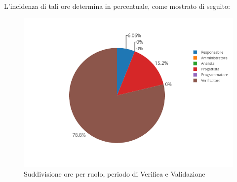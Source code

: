 L'incidenza di tali ore determina in percentuale, come mostrato di seguito:
\begin{figure}[H]
	\centering
	\includegraphics[scale=0.6]{img/Validazione.png}
	\caption{Suddivisione ore per ruolo, periodo di Verifica e Validazione}
\end{figure}

\newpage
